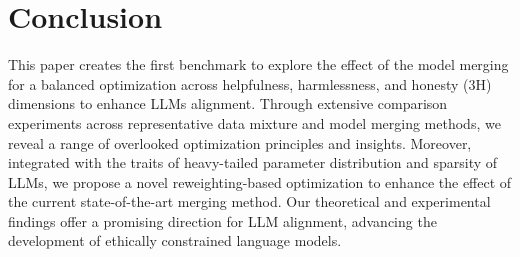 \section{Conclusion}
This paper creates the first benchmark to explore the effect of the model merging for a balanced optimization across helpfulness, harmlessness, and honesty (3H) dimensions to enhance LLMs alignment. Through extensive comparison experiments across representative data mixture and model merging methods, we reveal a range of overlooked optimization principles and insights. Moreover, integrated with the traits of heavy-tailed parameter distribution and sparsity of LLMs, we propose a novel reweighting-based optimization to enhance the effect of the current state-of-the-art merging method. Our theoretical and experimental findings offer a promising direction for LLM alignment, advancing the development of ethically constrained language models.








